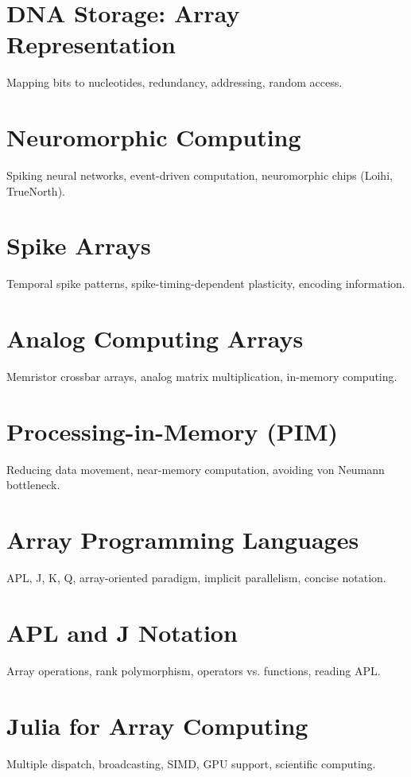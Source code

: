 \chapter{DNA Storage: Array Representation}
Mapping bits to nucleotides, redundancy, addressing, random access.

\chapter{Neuromorphic Computing}
Spiking neural networks, event-driven computation, neuromorphic chips (Loihi, TrueNorth).

\chapter{Spike Arrays}
Temporal spike patterns, spike-timing-dependent plasticity, encoding information.

\chapter{Analog Computing Arrays}
Memristor crossbar arrays, analog matrix multiplication, in-memory computing.

\chapter{Processing-in-Memory (PIM)}
Reducing data movement, near-memory computation, avoiding von Neumann bottleneck.


\chapter{Array Programming Languages}
APL, J, K, Q, array-oriented paradigm, implicit parallelism, concise notation.

\chapter{APL and J Notation}
Array operations, rank polymorphism, operators vs. functions, reading APL.

\chapter{Julia for Array Computing}
Multiple dispatch, broadcasting, SIMD, GPU support, scientific computing.

